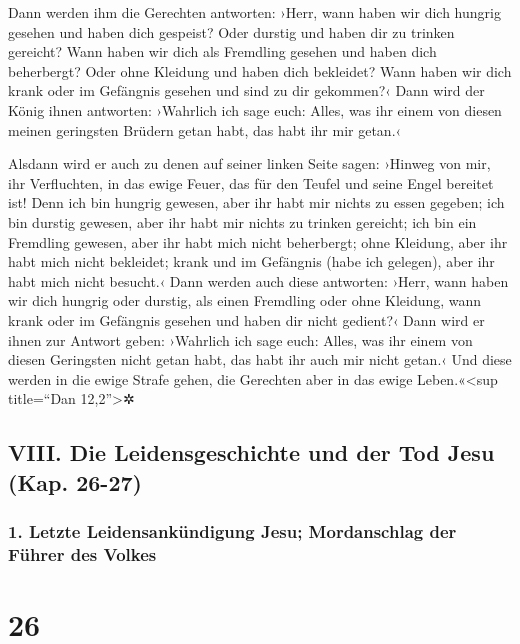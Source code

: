  Dann werden ihm die Gerechten antworten: ›Herr, wann
haben wir dich hungrig gesehen und haben dich gespeist? Oder durstig und
haben dir zu trinken gereicht?  Wann haben wir dich als
Fremdling gesehen und haben dich beherbergt? Oder ohne Kleidung und
haben dich bekleidet?  Wann haben wir dich krank oder im
Gefängnis gesehen und sind zu dir gekommen?‹  Dann wird
der König ihnen antworten: ›Wahrlich ich sage euch: Alles, was ihr einem
von diesen meinen geringsten Brüdern getan habt, das habt ihr mir
getan.‹

 Alsdann wird er auch zu denen auf seiner linken Seite
sagen: ›Hinweg von mir, ihr Verfluchten, in das ewige Feuer, das für den
Teufel und seine Engel bereitet ist!  Denn ich bin
hungrig gewesen, aber ihr habt mir nichts zu essen gegeben; ich bin
durstig gewesen, aber ihr habt mir nichts zu trinken gereicht;
 ich bin ein Fremdling gewesen, aber ihr habt mich nicht
beherbergt; ohne Kleidung, aber ihr habt mich nicht bekleidet; krank und
im Gefängnis (habe ich gelegen), aber ihr habt mich nicht besucht.‹
 Dann werden auch diese antworten: ›Herr, wann haben wir
dich hungrig oder durstig, als einen Fremdling oder ohne Kleidung, wann
krank oder im Gefängnis gesehen und haben dir nicht gedient?‹
 Dann wird er ihnen zur Antwort geben: ›Wahrlich ich sage
euch: Alles, was ihr einem von diesen Geringsten nicht getan habt, das
habt ihr auch mir nicht getan.‹  Und diese werden in die
ewige Strafe gehen, die Gerechten aber in das ewige Leben.«\textless sup
title=``Dan 12,2''\textgreater✲

\hypertarget{viii.-die-leidensgeschichte-und-der-tod-jesu-kap.-26-27}{%
\subsection{VIII. Die Leidensgeschichte und der Tod Jesu (Kap.
26-27)}\label{viii.-die-leidensgeschichte-und-der-tod-jesu-kap.-26-27}}

\hypertarget{letzte-leidensankuxfcndigung-jesu-mordanschlag-der-fuxfchrer-des-volkes}{%
\subsubsection{1. Letzte Leidensankündigung Jesu; Mordanschlag der
Führer des
Volkes}\label{letzte-leidensankuxfcndigung-jesu-mordanschlag-der-fuxfchrer-des-volkes}}

\hypertarget{section-25}{%
\section{26}\label{section-25}}

